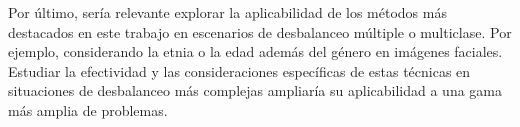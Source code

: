 Por último, sería relevante explorar la aplicabilidad de los métodos más destacados en este trabajo en escenarios de desbalanceo múltiple o multiclase. Por ejemplo, considerando la etnia o la edad además del género en imágenes faciales. Estudiar la efectividad y las consideraciones específicas de estas técnicas en situaciones de desbalanceo más complejas ampliaría su aplicabilidad a una gama más amplia de problemas.